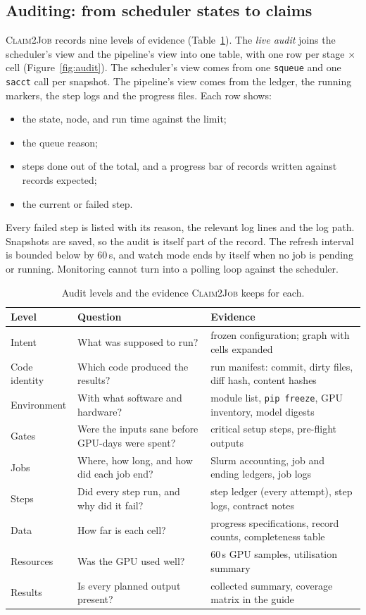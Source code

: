 \documentclass[pdflatex,sn-mathphys-num]{sn-jnl}
\theoremstyle{thmstyleone}%
\theoremstyle{thmstyletwo}%
\theoremstyle{thmstylethree}%
\newcommand{\cj}{\textsc{Claim2Job}}
\newcommand{\code}[1]{\texttt{#1}}
\begin{document}
\subsection{Auditing: from scheduler states to claims}\label{sec:audit}

\cj{} records nine levels of evidence (Table~\ref{tab:audit}). The \emph{live
audit} joins the scheduler's view and the pipeline's view into one table, with
one row per stage $\times$ cell (Figure~\ref{fig:audit}). The scheduler's view
comes from one \code{squeue} and one \code{sacct} call per snapshot. The
pipeline's view comes from the ledger, the running markers, the step logs and
the progress files. Each row shows:
\begin{itemize}[leftmargin=1.4em, itemsep=1pt]
\item the state, node, and run time against the limit;
\item the queue reason;
\item steps done out of the total, and a progress bar of records written
against records expected;
\item the current or failed step.
\end{itemize}
Every failed step is listed with its reason, the relevant log lines and the
log path. Snapshots are saved, so the audit is itself part of the record. The
refresh interval is bounded below by 60\,s, and watch mode ends by itself when
no job is pending or running. Monitoring cannot turn into a polling loop
against the scheduler.

\begin{table}[t]
\centering\small
\caption{Audit levels and the evidence \cj{} keeps for each.}\label{tab:audit}
\begin{tabularx}{\textwidth}{@{}l X X@{}}
\toprule
Level & Question & Evidence \\
\midrule
Intent & What was supposed to run? & frozen configuration; graph with cells expanded \\
Code identity & Which code produced the results? & run manifest: commit, dirty files, diff hash, content hashes \\
Environment & With what software and hardware? & module list, \code{pip freeze}, GPU inventory, model digests \\
Gates & Were the inputs sane before GPU-days were spent? & critical setup steps, pre-flight outputs \\
Jobs & Where, how long, and how did each job end? & Slurm accounting, job and ending ledgers, job logs \\
Steps & Did every step run, and why did it fail? & step ledger (every attempt), step logs, contract notes \\
Data & How far is each cell? & progress specifications, record counts, completeness table \\
Resources & Was the GPU used well? & 60\,s GPU samples, utilisation summary \\
Results & Is every planned output present? & collected summary, coverage matrix in the guide \\
\bottomrule
\end{tabularx}
\end{table}
\end{document}
